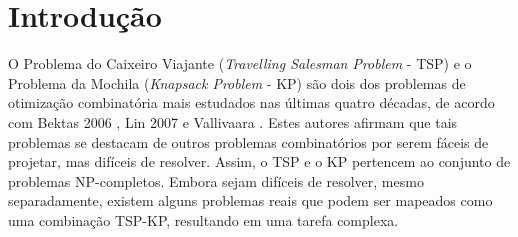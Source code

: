 \chapter{Introdução}








O Problema do Caixeiro Viajante (\textit{Travelling Salesman Problem} - TSP) e o Problema da Mochila (\textit{Knapsack Problem} - KP) são dois dos problemas de otimização combinatória mais estudados nas últimas quatro décadas, de acordo com Bektas 2006 \cite{bektas2006multiple}, Lin 2007 \cite{lin2008solving} e Vallivaara \cite{vallivaara2008team}. Estes autores afirmam que tais problemas se destacam de outros problemas combinatórios por serem fáceis de projetar, mas difíceis de resolver. Assim, o TSP e o KP pertencem ao conjunto de problemas NP-completos. Embora sejam difíceis de resolver, mesmo separadamente, existem alguns problemas reais que podem ser mapeados como uma combinação TSP-KP, resultando em uma tarefa complexa.

